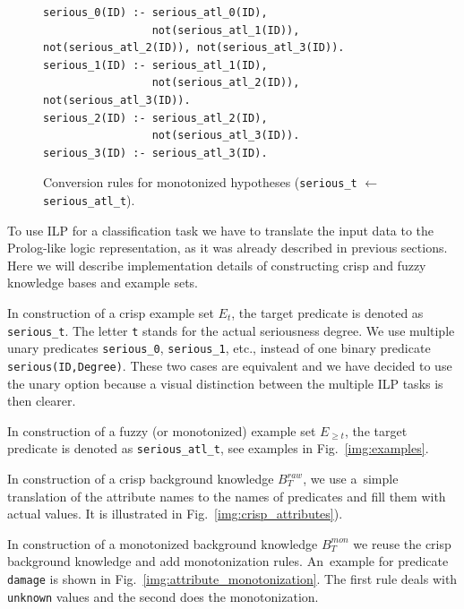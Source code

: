 \begin{figure}[htb]	
\begin{verbatim}
serious_0(ID) :- serious_atl_0(ID),
                 not(serious_atl_1(ID)), not(serious_atl_2(ID)), not(serious_atl_3(ID)).
serious_1(ID) :- serious_atl_1(ID),
                 not(serious_atl_2(ID)), not(serious_atl_3(ID)).
serious_2(ID) :- serious_atl_2(ID),
                 not(serious_atl_3(ID)).
serious_3(ID) :- serious_atl_3(ID).
\end{verbatim}						
\caption{Conversion rules for monotonized hypotheses (\texttt{serious\_t} $\leftarrow$ \texttt{serious\_atl\_t}).}
\label{img:conversion}
\end{figure}





To use ILP for a classification task we have to translate the input data to the Prolog-like logic representation, as it was already described in previous sections. Here we will describe implementation details of constructing crisp and fuzzy knowledge bases and example sets.

In construction of a crisp example set $E_t$, the target predicate is denoted as \texttt{serious\_t}. The letter \texttt{t} stands for the actual seriousness degree. We use multiple unary predicates \texttt{serious\_0}, \texttt{serious\_1}, etc., instead of one binary predicate \texttt{serious(ID,Degree)}. These two cases are equivalent and we have decided to use the unary option because a visual distinction between the multiple ILP tasks is then clearer.

In construction of a fuzzy (or monotonized) example set $E_{\ge t}$, the target predicate is denoted as \texttt{serious\_atl\_t}, see examples in Fig.~\ref{img:examples}.



In construction of a crisp background knowledge $B^{raw}_{T}$, we use a~simple translation of the attribute names to the names of predicates and fill them with actual values. It is illustrated in Fig.~\ref{img:crisp_attributes}). 



In construction of a monotonized background knowledge $B^{mon}_T$ we reuse the crisp background knowledge and add monotonization rules. An~example for predicate \texttt{damage} is shown in Fig.~\ref{img:attribute_monotonization}.
The first rule deals with \texttt{unknown} values and the second does the monotonization. 

